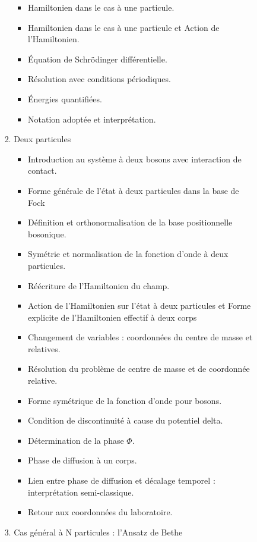 \documentclass[8pt, landscape]{report}
\begin{document}
\begin{multicols}{3}
\begin{enumerate}
\begin{enumerate}
\begin{enumerate}
\begin{enumerate}
\begin{itemize}
									\item Hamiltonien dans le cas à une particule. 
									\item Hamiltonien dans le cas à une particule et Action de l’Hamiltonien. 
									\item Équation de Schrödinger différentielle.
									\item Résolution avec conditions périodiques. 
									\item Énergies quantifiées. 
									\item Notation adoptée et interprétation. 
								\end{itemize}
							\item Deux particules
								\begin{itemize}
									\item Introduction au système à deux bosons avec interaction de contact. 
									\item Forme générale de l’état à deux particules dans la base de Fock 
									\item Définition et orthonormalisation de la base positionnelle bosonique. 
									\item Symétrie et normalisation de la fonction d’onde à deux particules. 
									\item Réécriture de l’Hamiltonien du champ. 
									\item Action de l’Hamiltonien sur l’état à deux particules et Forme explicite de l’Hamiltonien effectif à deux corps
									\item Changement de variables : coordonnées du centre de masse et relatives. 
									\item Résolution du problème de centre de masse et de coordonnée relative.
									\item Forme symétrique de la fonction d’onde pour bosons.
									\item Condition de discontinuité à cause du potentiel delta. 
									\item Détermination de la phase $\Phi$. 
									\item Phase de diffusion à un corps.
									\item Lien entre phase de diffusion et décalage temporel : interprétation semi-classique.
									\item Retour aux coordonnées du laboratoire. 								
								\end{itemize}
							\item Cas général à N particules : l’Ansatz de Bethe	
						\end{enumerate}

\end{enumerate}
\end{enumerate}
\end{enumerate}
\end{multicols}
\end{document}
